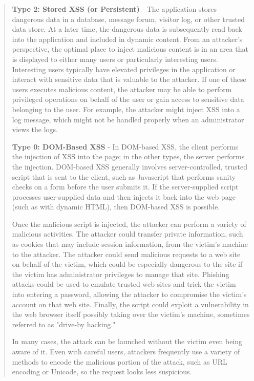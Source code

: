 \begin{quote}
	\textbf{Type 2: Stored XSS (or Persistent)} - The application stores dangerous data in a database, message forum, visitor log, or other trusted data store. At a later time, the dangerous data is subsequently read back into the application and included in dynamic content. From an attacker's perspective, the optimal place to inject malicious content is in an area that is displayed to either many users or particularly interesting users. Interesting users typically have elevated privileges in the application or interact with sensitive data that is valuable to the attacker. If one of these users executes malicious content, the attacker may be able to perform privileged operations on behalf of the user or gain access to sensitive data belonging to the user. For example, the attacker might inject XSS into a log message, which might not be handled properly when an administrator views the logs.

	\textbf{Type 0: DOM-Based XSS} - In DOM-based XSS, the client performs the injection of XSS into the page; in the other types, the server performs the injection. DOM-based XSS generally involves server-controlled, trusted script that is sent to the client, such as Javascript that performs sanity checks on a form before the user submits it. If the server-supplied script processes user-supplied data and then injects it back into the web page (such as with dynamic HTML), then DOM-based XSS is possible.

	Once the malicious script is injected, the attacker can perform a variety of malicious activities. The attacker could transfer private information, such as cookies that may include session information, from the victim's machine to the attacker. The attacker could send malicious requests to a web site on behalf of the victim, which could be especially dangerous to the site if the victim has administrator privileges to manage that site. Phishing attacks could be used to emulate trusted web sites and trick the victim into entering a password, allowing the attacker to compromise the victim's account on that web site. Finally, the script could exploit a vulnerability in the web browser itself possibly taking over the victim's machine, sometimes referred to as "drive-by hacking."

	In many cases, the attack can be launched without the victim even being aware of it. Even with careful users, attackers frequently use a variety of methods to encode the malicious portion of the attack, such as URL encoding or Unicode, so the request looks less suspicious. \cite{mitre/XSS}
\end{quote}

